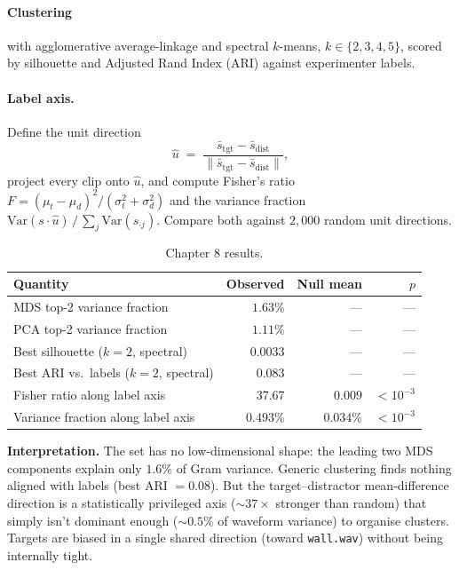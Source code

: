 \documentclass[11pt]{article}
\begin{document}
\paragraph{Clustering} with agglomerative average-linkage and spectral
$k$-means, $k \in \{2,3,4,5\}$, scored by silhouette and Adjusted Rand
Index (ARI) against experimenter labels.

\paragraph{Label axis.}
Define the unit direction
\[
  \hat u
  \;=\;
  \frac{\bar s_{\text{tgt}} - \bar s_{\text{dist}}}
       {\|\bar s_{\text{tgt}} - \bar s_{\text{dist}}\|},
\]
project every clip onto $\hat u$, and compute Fisher's ratio
$F = (\mu_t - \mu_d)^2 / (\sigma_t^2 + \sigma_d^2)$ and the variance
fraction $\mathrm{Var}(s\cdot\hat u)\,/\,\sum_j \mathrm{Var}(s_{\cdot j})$.
Compare both against $2{,}000$ random unit directions.

\begin{table}[H]
\centering
\caption{Chapter 8 results.}
\begin{tabular}{lrrr}
\toprule
Quantity & Observed & Null mean & $p$ \\
\midrule
MDS top-2 variance fraction        & $1.63\%$ & --- & --- \\
PCA top-2 variance fraction        & $1.11\%$ & --- & --- \\
Best silhouette ($k=2$, spectral)  & $0.0033$ & --- & --- \\
Best ARI vs.\ labels ($k=2$, spectral) & $0.083$ & --- & --- \\
Fisher ratio along label axis      & $37.67$  & $0.009$ & $<10^{-3}$ \\
Variance fraction along label axis & $0.493\%$ & $0.034\%$ & $<10^{-3}$ \\
\bottomrule
\end{tabular}
\end{table}

\textbf{Interpretation.}
The set has no low-dimensional shape: the leading two MDS components
explain only $1.6\%$ of Gram variance.  Generic clustering finds
nothing aligned with labels (best ARI $= 0.08$).  But the
target--distractor mean-difference direction is a statistically
privileged axis ($\sim\!37\times$ stronger than random) that simply
isn't dominant enough ($\sim\!0.5\%$ of waveform variance) to organise
clusters.  Targets are biased in a single shared direction (toward
\texttt{wall.wav}) without being internally tight.
\end{document}
